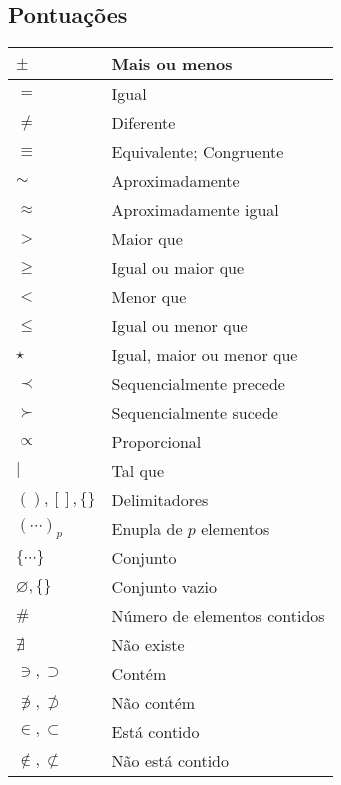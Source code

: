 \subsection{Pontuações}
    \begin{center}
        \begin{longtable}{| m{3cm} | m{12cm} |}
            \hline $ \pm $ & Mais ou menos\\
            \hline $ = $ & Igual\\
            \hline $ \neq $ & Diferente\\
            \hline $ \equiv $ & Equivalente; Congruente\\
            \hline $ \sim $ & Aproximadamente\\
            \hline $ \approx $ & Aproximadamente igual\\
            \hline $ > $ & Maior que\\
            \hline $ \geq $ & Igual ou maior que\\
            \hline $ < $ & Menor que\\
            \hline $ \leq $ & Igual ou menor que\\
            \hline $ \star $ & Igual, maior ou menor que\\
            \hline $ \prec $ & Sequencialmente precede\\
            \hline $ \succ $ & Sequencialmente sucede\\
            \hline $ \propto $ & Proporcional\\
            \hline $ | $ & Tal que\\
            \hline $ ( ), [ ], \{ \} $ & Delimitadores\\
            \hline $ (\cdots)_p $ & Enupla de $p$ elementos\\
            \hline $ \{\cdots\} $ & Conjunto\\
            \hline $ \varnothing, \{\} $ & Conjunto vazio\\
            \hline $ \# $ & Número de elementos contidos\\
            \hline $ \nexists $ & Não existe\\
            \hline $ \ni, \supset $ & Contém\\
            \hline $ \not\ni, \not\supset $ & Não contém\\
            \hline $ \in, \subset $ & Está contido\\
            \hline $ \notin, \not\subset  $ & Não está contido\\

\end{longtable}
\end{center}
